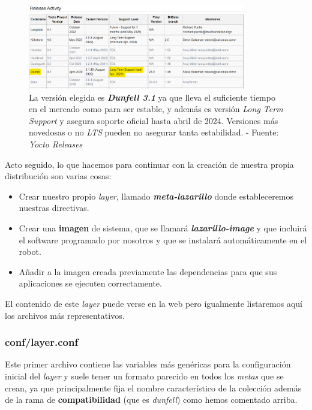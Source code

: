 \begin{figure}[h]
	\centering
	\includegraphics[width=0.85\textwidth]{imagenes/yocto-releases.png}
	\caption{La versión elegida es \textbf{\textit{Dunfell 3.1}} ya que lleva el suficiente tiempo en el mercado como para ser estable, y además es versión \textit{Long Term Support} y asegura soporte oficial hasta abril de 2024. Versiones más novedosas o no \textit{LTS} pueden no asegurar tanta estabilidad. - Fuente: \textit{Yocto Releases} \cite{yocto-releases}}
	\label{yocto-releases}
\end{figure}

Acto seguido, lo que hacemos para continuar con la creación de nuestra propia distribución son varias cosas:

\begin{itemize}
	\item Crear nuestro propio \textit{layer}, llamado \textbf{\textit{meta-lazarillo}} donde estableceremos nuestras directivas.
	\item Crear una \textbf{imagen} de sistema, que se llamará \textbf{\textit{lazarillo-image}} y que incluirá el software programado por nosotros y que se instalará automáticamente en el robot.
	\item Añadir a la imagen creada previamente las dependencias para que sus aplicaciones se ejecuten correctamente.
\end{itemize}

El contenido de este \textit{layer} puede verse en la web \cite{meta-lazarillo} pero igualmente listaremos aquí los archivos más representativos.\\

\subsubsection{conf/layer.conf}

Este primer archivo contiene las variables más genéricas para la configuración inicial del \textit{layer} y suele tener un formato parecido en todos los \textit{metas} que se crean, ya que principalmente fija el nombre característico de la colección además de la rama de \textbf{compatibilidad} (que es \textit{dunfell}) como hemos comentado arriba. 

